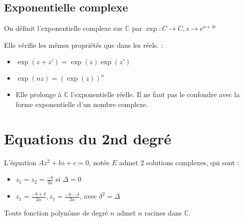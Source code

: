 \documentclass[french]{yLectureNote}
\begin{document}
\subsection{Exponentielle complexe}
On définit l'exponentielle complexe sur $\mathbb{C}$ par $\exp : C\to C, z \to e^{a+ib}$

Elle vérifie les m\^emes propriétés que dans les réels. :

\begin{itemize}
 \item $\exp(z+z') = \exp(z)\exp(z')$
 \item $\exp(nz) = (\exp(z))^n$
 \item Elle prolonge à $\mathbb{C}$ l'exponentielle réelle. Il ne faut pas le confondre avec la forme exponentielle d'un nombre complexe.
\end{itemize}
\section{Equations du 2nd degré}
\begin{theorem}
L'équation $Az^2+bz+c = 0$, notée $E$ admet 2 solutions complexes, qui sont :
\begin{itemize}
 \item $z_1=z_2 = \frac{-b}{2a}$ si $\Delta =0$
 \item $z_1 = \frac{-b+\delta}{2a}, z_1 = \frac{-b-\delta}{2a}$, avec $\delta^2 = \Delta$
\end{itemize}
\end{theorem}
\begin{theorem}
Toute fonction polynôme de degré $n$  admet $n$ racines dans $\mathbb{C}$.
\end{theorem}
\end{document}
